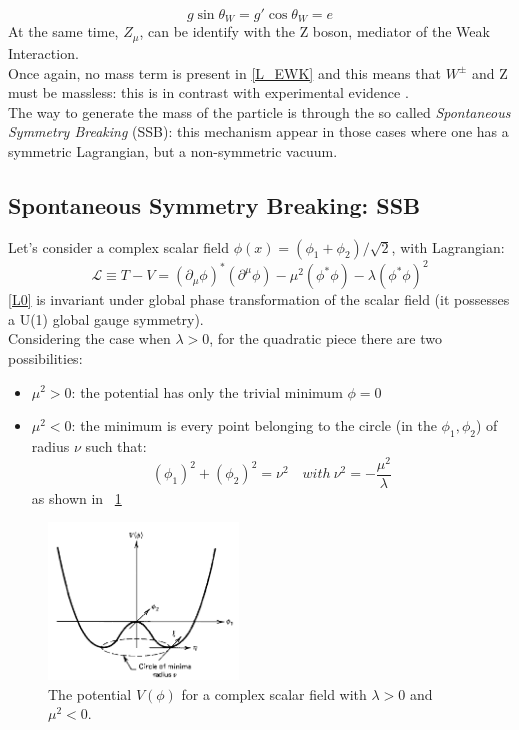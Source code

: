 \begin{equation}
g\sin\theta_{W} = g'\cos\theta_{W} = e
\label{g_gprime}
\end{equation}
At the same time, $Z_{\mu}$, can be identify with the Z boson, mediator of the Weak Interaction. \\
Once again, no mass term is present in \ref{L_EWK} and this means that $W^{\pm}$ and Z must be massless: this is in contrast with experimental evidence \cite{Wboson}\cite{Zboson}. \\
The way to generate the mass of the particle is through the so called \textit{Spontaneous Symmetry Breaking} (SSB): this mechanism appear in those cases where one has a symmetric Lagrangian, but a non-symmetric vacuum. 

\subsection{Spontaneous Symmetry Breaking: SSB}
Let's consider a complex scalar field $\phi(x) = (\phi_{1} + \phi_{2}) / \sqrt{2}$, with Lagrangian:
\begin{equation}
\mathcal{L} \equiv T - V = (\partial_{\mu}\phi)^{*}(\partial^{\mu}\phi) - \mu^{2}(\phi^{*}\phi)-\lambda(\phi^{*}\phi)^{2}
\label{L0}
\end{equation}
\ref{L0} is invariant under global phase transformation of the scalar field (it possesses a U(1) global gauge symmetry). \\
Considering the case when $\lambda > 0$, for the quadratic piece there are two possibilities:
\begin{itemize}
\item{$\mu^{2} > 0$:} the potential has only the trivial minimum $\phi = 0$
\item{$\mu^{2} < 0$:} the minimum is every point belonging to the circle (in the $\phi_{1}, \phi_{2}$) of radius $\nu$ such that:
	\begin{equation}
	(\phi_{1})^{2}+(\phi_{2})^{2} = \nu^{2} \quad with\ \nu^{2} = - \frac{\mu^{2}}{\lambda}
	\end{equation}
	as shown in \figurename~\ref{V_phi_potential}
\end{itemize}
\begin{figure}[htbp]
\centering
\includegraphics[width=0.45\textwidth]{Images/Vphi.png}
\caption{The potential $V(\phi)$ for a complex scalar field with $\lambda > 0$ and $\mu^{2} < 0$. }
\label{V_phi_potential}
\end{figure}
